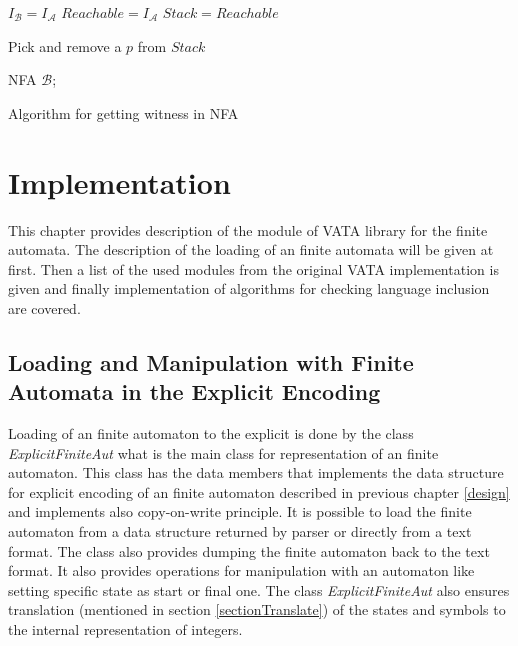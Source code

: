 \begin{algorithm}[H]
	\label{algCandidate}



  $I_\mathcal{B} = I_\mathcal{A}$\;
  $Reachable = I_\mathcal{A}$\;
  $Stack = Reachable$\;
	
   {
			Pick and remove a $p$ from $Stack$\;
	}

	\Return NFA $\mathcal{B}$;
	\caption{Algorithm for getting witness in NFA}
\end{algorithm}



\chapter{Implementation}
\label{implementation}
This chapter provides description of the module of VATA library for the finite automata. The description of the loading of an finite
automata will be given at first. Then a list of the used modules from the original VATA implementation is given and finally implementation of algorithms
for checking language inclusion are covered.

\section{Loading and Manipulation with Finite Automata in the Explicit Encoding}
Loading of an finite automaton to the explicit is done by  the class \emph{ExplicitFiniteAut} what is the main class for representation of an finite automaton. 
This class has the data members that implements the data structure for explicit encoding of an finite automaton described in previous chapter \ref{design} and
implements also copy-on-write principle. 
It is possible to load the finite automaton from a data structure returned by parser or directly from a text format. The class also provides dumping
the finite automaton back to the text format.
It also provides operations for manipulation with an automaton like setting specific state as start or final one.
The class \emph{ExplicitFiniteAut} also ensures translation (mentioned in section \ref{sectionTranslate}) of the states 
and symbols to the internal representation of integers. 

